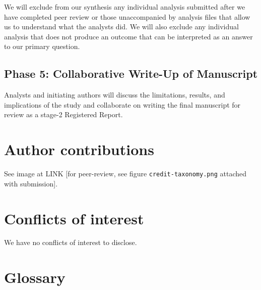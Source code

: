 \documentclass[Review,times,sageh]{sagej}
\begin{document}
We will exclude from our synthesis any individual analysis submitted
after we have completed peer review or those unaccompanied by analysis
files that allow us to understand what the analysts did. We will also
exclude any individual analysis that does not produce an outcome that
can be interpreted as an answer to our primary question.

\subsection{Phase 5: Collaborative Write-Up of
Manuscript}\label{phase-5-collaborative-write-up-of-manuscript}

Analysts and initiating authors will discuss the limitations, results,
and implications of the study and collaborate on writing the final
manuscript for review as a stage-2 Registered Report.

\section{Author contributions}\label{author-contributions}

See image at LINK {[}for peer-review, see figure
\texttt{credit-taxonomy.png} attached with submission{]}.

\section{Conflicts of interest}\label{conflicts-of-interest}

We have no conflicts of interest to disclose.

\appendix

\section{Glossary}\label{glossary}
\end{document}
